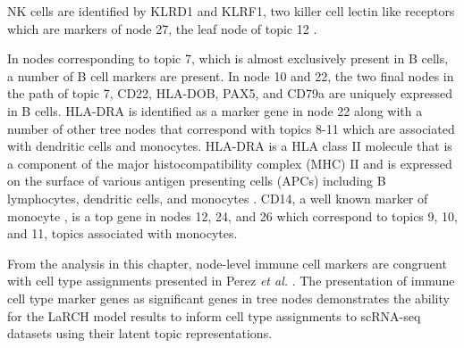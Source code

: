 NK cells are identified by KLRD1 and KLRF1, two killer cell lectin like receptors which are markers of node 27, the leaf node of topic 12 \cite{cozar2021tumor}.

In nodes corresponding to topic 7, which is almost exclusively present in B cells, a number of B cell markers are present. In node 10 and 22, the two final nodes in the path of topic 7, CD22, HLA-DOB, PAX5, and CD79a are uniquely expressed in B cells. \cite{moyron2002expression, nagarajan2002class, chu2001cd79, desouki2010pax} HLA-DRA is identified as a marker gene in node 22 along with a number of other tree nodes that correspond with topics 8-11 which are associated with dendritic cells and monocytes. HLA-DRA is a HLA class II molecule that is a component of the major histocompatibility complex (MHC) II and is expressed on the surface of various antigen presenting cells (APCs) including B lymphocytes, dendritic cells, and monocytes \cite{VANDENELSEN200467}. CD14, a well known marker of monocyte \cite{goyert1986biochemistry}, is a top gene in nodes 12, 24, and 26 which correspond to topics 9, 10, and 11, topics associated with monocytes. 

From the analysis in this chapter, node-level immune cell markers are congruent with cell type assignments presented in Perez \textit{et al.} \cite{sledata}. The presentation of immune cell type marker genes as significant genes in tree nodes demonstrates the ability for the LaRCH model results to inform cell type assignments to scRNA-seq datasets using their latent topic representations. 

